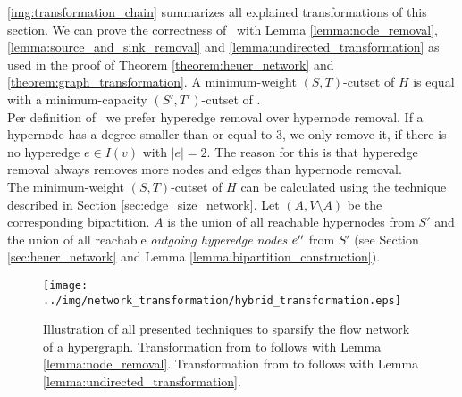 \autoref{img:transformation_chain} summarizes all explained transformations of this section.
We can prove the correctness of \ShortHybrid~with Lemma \ref{lemma:node_removal}, \ref{lemma:source_and_sink_removal}
and \ref{lemma:undirected_transformation} as used in the proof of Theorem \ref{theorem:heuer_network}
and \ref{theorem:graph_transformation}. A minimum-weight $(S,T)$-cutset of $H$ is equal with a
minimum-capacity $(S',T')$-cutset of \ShortHybrid. \\
Per definition of \ShortHybrid~we prefer hyperedge removal over hypernode removal. If
a hypernode has a degree smaller than or equal to $3$, we only remove it, if there is no hyperedge
$e \in I(v)$ with $|e| = 2$. The reason for this is that hyperedge removal always removes more nodes
and edges than hypernode removal. \\
The minimum-weight $(S,T)$-cutset of $H$ can be calculated using the technique described in Section
\ref{sec:edge_size_network}. Let $(A,V\setminus A)$ be the corresponding bipartition.
$A$ is the union of all reachable hypernodes from $S'$ and the union of
all reachable \emph{outgoing hyperedge nodes} $e''$ from $S'$ (see Section \ref{sec:heuer_network} 
and Lemma \ref{lemma:bipartition_construction}). 
\begin{figure}[ht!]
\centering
\texttt{[image: ../img/network\_transformation/hybrid\_transformation.eps]}
\caption{Illustration of all presented techniques to sparsify the flow network of a hypergraph.
         Transformation from  to  follows with Lemma \ref{lemma:node_removal}.
         Transformation from  to  follows with Lemma \ref{lemma:undirected_transformation}.}
\label{img:transformation_chain} 
\end{figure}
